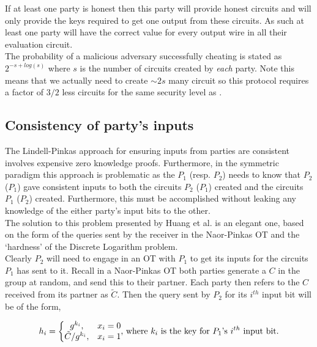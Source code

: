 \documentclass[ %
                    author={Nicholas Tutte},
                supervisor={Prof. Nigel Smart},
                    degree={MEng},
                     title={Secure Two Party Computation},
                  subtitle={A practical comparison of recent protocols},
                      type={Research - GG1K},
                      year={2015} ]{dissertation}
\begin{document}
				If at least one party is honest then this party will provide honest circuits and will only provide the keys required to get one output from these circuits. As such at least one party will have the correct value for every output wire in all their evaluation circuit.\\

				The probability of a malicious adversary successfully cheating is stated as $2^{-s + log(s)}$ where $s$ is the number of circuits created by \emph{each} party. Note this means that we actually need to create $\sim 2s$ many circuit so this protocol requires a factor of $3/2$ less circuits for the same security level as \cite{LindellAndPinkas2011}.\\
				
			\subsection{Consistency of party's inputs}
				The Lindell-Pinkas approach for ensuring inputs from parties are consistent involves expensive zero knowledge proofs. Furthermore, in the symmetric paradigm this approach is problematic as the $P_1$ (resp. $P_2$) needs to know that $P_2$ ($P_1$) gave consistent inputs to both the circuits $P_2$ ($P_1$) created and the circuits $P_1$ ($P_2$) created. Furthermore, this must be accomplished without leaking any knowledge of the either party's input bits to the other.\\

				The solution to this problem presented by Huang et al. is an elegant one, based on the form of the queries sent by the receiver in the Naor-Pinkas OT and the `hardness' of the Discrete Logarithm problem.\\

				Clearly $P_2$ will need to engage in an OT with $P_1$ to get its inputs for the circuits $P_1$ has sent to it. Recall in a Naor-Pinkas OT both parties generate a $C$ in the group at random, and send this to their partner. Each party then refers to the $C$ received from its partner as $\tilde C$. Then the query sent by $P_2$ for its $i^{th}$ input bit will be of the form,

				$$
				h_i = \bigg\{
					\begin{matrix}
						g^{k_i}, & x_i = 0\\
						\tilde C / g^{k_i}, & x_i = 1
					\end{matrix}
					\textnormal{,  where } k_i \textnormal{ is the key for } P_1 \textnormal{'s } i^{th} \textnormal{ input bit.}
				$$
\end{document}
